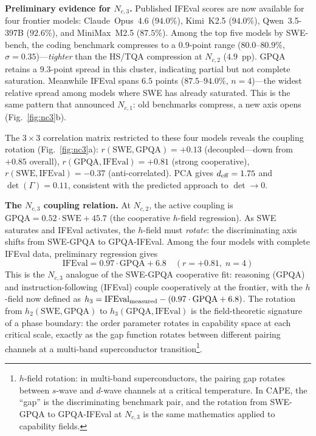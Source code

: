 \documentclass[11pt]{article}
\begin{document}
\textbf{Preliminary evidence for $N_{c,3}$.}
Published IFEval scores are now available for four frontier models: Claude~Opus~4.6 ($94.0\%$), Kimi~K2.5 ($94.0\%$), Qwen~3.5-397B ($92.6\%$), and MiniMax~M2.5 ($87.5\%$).
Among the top five models by SWE-bench, the coding benchmark compresses to a $0.9$-point range ($80.0$--$80.9\%$, $\sigma = 0.35$)---\emph{tighter} than the HS/TQA compression at $N_{c,2}$ ($4.9$~pp).
GPQA retains a $9.3$-point spread in this cluster, indicating partial but not complete saturation.
Meanwhile IFEval spans $6.5$ points ($87.5$--$94.0\%$, $n=4$)---the widest relative spread among models where SWE has already saturated.
This is the same pattern that announced $N_{c,1}$: old benchmarks compress, a new axis opens (Fig.~\ref{fig:nc3}b).

The $3{\times}3$ correlation matrix restricted to these four models reveals the coupling rotation (Fig.~\ref{fig:nc3}a):
$r(\text{SWE}, \text{GPQA}) = +0.13$ (decoupled---down from $+0.85$ overall),
$r(\text{GPQA}, \text{IFEval}) = +0.81$ (strong cooperative),
$r(\text{SWE}, \text{IFEval}) = -0.37$ (anti-correlated).
PCA gives $d_{\rm eff} = 1.75$ and $\det(\Gamma) = 0.11$, consistent with the predicted approach to $\det \to 0$.

\textbf{The $N_{c,3}$ coupling relation.}
At $N_{c,2}$, the active coupling is $\text{GPQA} = 0.52\cdot\text{SWE} + 45.7$ (the cooperative $h$-field regression).
As SWE saturates and IFEval activates, the $h$-field must \emph{rotate}: the discriminating axis shifts from SWE-GPQA to GPQA-IFEval.
Among the four models with complete IFEval data, preliminary regression gives
\begin{equation}
  \text{IFEval} = 0.97\cdot\text{GPQA} + 6.8 \quad (r = +0.81,\; n=4)
\label{eq:nc3_coupling}
\end{equation}
This is the $N_{c,3}$ analogue of the SWE-GPQA cooperative fit: reasoning (GPQA) and instruction-following (IFEval) couple cooperatively at the frontier, with the $h$-field now defined as $h_{3} = \text{IFEval}_{\rm measured} - (0.97\cdot\text{GPQA} + 6.8)$.
The rotation from $h_2(\text{SWE}, \text{GPQA})$ to $h_3(\text{GPQA}, \text{IFEval})$ is the field-theoretic signature of a phase boundary: the order parameter rotates in capability space at each critical scale, exactly as the gap function rotates between different pairing channels at a multi-band superconductor transition\footnote{$h$-field rotation: in multi-band superconductors, the pairing gap rotates between $s$-wave and $d$-wave channels at a critical temperature. In CAPE, the ``gap'' is the discriminating benchmark pair, and the rotation from SWE-GPQA to GPQA-IFEval at $N_{c,3}$ is the same mathematics applied to capability fields.}.
\end{document}
